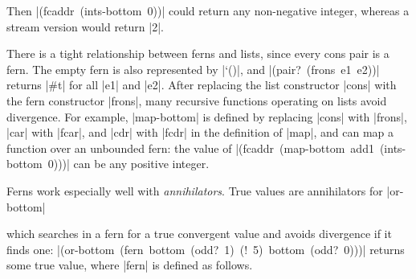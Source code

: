 \noindent Then \mbox{\scheme|(fcaddr (ints-bottom 0))|} 
could return any non-negative integer, whereas a
stream version would return \schemeresult|2|.



There is a tight relationship between ferns and lists, since every
cons pair is a fern.  The empty
fern is also represented by \scheme|`()|, and
\mbox{\scheme|(pair? (frons e1 e2))|} returns \schemeresult|#t| for
all \scheme|e1| and \scheme|e2|.  After replacing the list constructor
\scheme|cons| with the fern constructor \scheme|frons|, many recursive
functions operating on lists avoid divergence.  For example,
\scheme|map-bottom| is defined
by replacing \scheme|cons| with \scheme|frons|, \scheme|car| with
\scheme|fcar|, and \scheme|cdr| with \scheme|fcdr| in the definition of
\scheme|map|, and can map a function over an unbounded fern:
the value of \mbox{\scheme|(fcaddr (map-bottom add1 (ints-bottom 0)))|} can be any positive integer.



Ferns work especially well with \emph{annihilators}. True values are
annihilators for \scheme|or-bottom|

\schemedisplayspace
{}

\noindent which searches in a fern for a true convergent value
and avoids divergence if it finds one:
\mbox{\scheme|(or-bottom (fern bottom (odd? 1) (! 5) bottom (odd? 0)))|}
returns some true value, where \scheme|fern| is defined as follows.

\schemedisplayspace
{}


